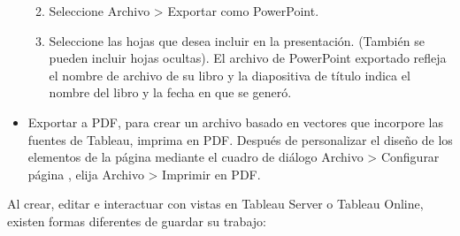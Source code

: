 \documentclass[
]{book}
\providecommand{\tightlist}{%
  \setlength{\itemsep}{0pt}\setlength{\parskip}{0pt}}
\begin{document}
\begin{itemize}
  \begin{enumerate}
  \def\labelenumi{\arabic{enumi}.}
  \tightlist
  \item
    Seleccione Archivo \textgreater{} Exportar como PowerPoint.
  \item
    Seleccione las hojas que desea incluir en la presentación. (También se pueden incluir hojas ocultas). El archivo de PowerPoint exportado refleja el nombre de archivo de su libro y la diapositiva de título indica el nombre del libro y la fecha en que se generó.
  \end{enumerate}
\item
  Exportar a PDF, para crear un archivo basado en vectores que incorpore las fuentes de Tableau, imprima en PDF. Después de personalizar el diseño de los elementos de la página mediante el cuadro de diálogo Archivo \textgreater{} Configurar página , elija Archivo \textgreater{} Imprimir en PDF.
\end{itemize}

Al crear, editar e interactuar con vistas en Tableau Server o Tableau Online, existen formas diferentes de guardar su trabajo:
\end{document}

